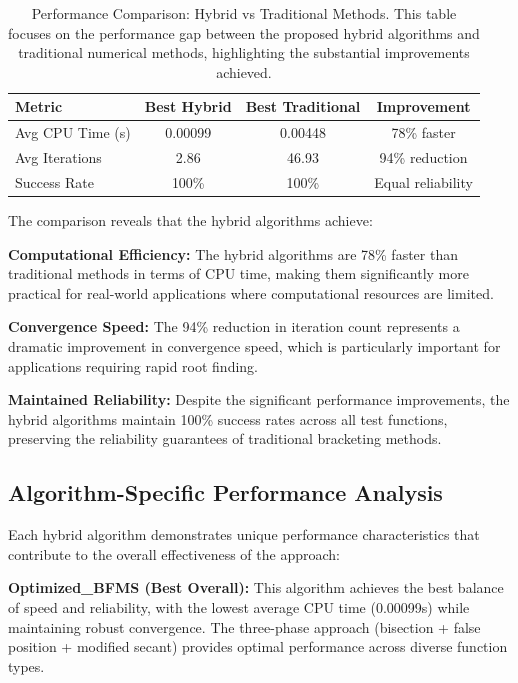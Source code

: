 \documentclass[amsmath, amssymb, aps]{revtex4-2}
\begin{document}
\begin{table}[H]
\centering
\caption{Performance Comparison: Hybrid vs Traditional Methods. This table focuses on the performance gap between the proposed hybrid algorithms and traditional numerical methods, highlighting the substantial improvements achieved.}
\label{tab:traditional_comparison}
\begin{tabular}{lccc}
\toprule
Metric & Best Hybrid & Best Traditional & Improvement \\
\midrule
Avg CPU Time (s) & 0.00099 & 0.00448 & 78\% faster \\
Avg Iterations & 2.86 & 46.93 & 94\% reduction \\
Success Rate & 100\% & 100\% & Equal reliability \\
\bottomrule
\end{tabular}
\end{table}

The comparison reveals that the hybrid algorithms achieve:

\textbf{Computational Efficiency:} The hybrid algorithms are 78\% faster than traditional methods in terms of CPU time, making them significantly more practical for real-world applications where computational resources are limited.

\textbf{Convergence Speed:} The 94\% reduction in iteration count represents a dramatic improvement in convergence speed, which is particularly important for applications requiring rapid root finding.

\textbf{Maintained Reliability:} Despite the significant performance improvements, the hybrid algorithms maintain 100\% success rates across all test functions, preserving the reliability guarantees of traditional bracketing methods.

\subsection{Algorithm-Specific Performance Analysis}

Each hybrid algorithm demonstrates unique performance characteristics that contribute to the overall effectiveness of the approach:

\textbf{Optimized\_BFMS (Best Overall):} This algorithm achieves the best balance of speed and reliability, with the lowest average CPU time (0.00099s) while maintaining robust convergence. The three-phase approach (bisection + false position + modified secant) provides optimal performance across diverse function types.
\end{document}
